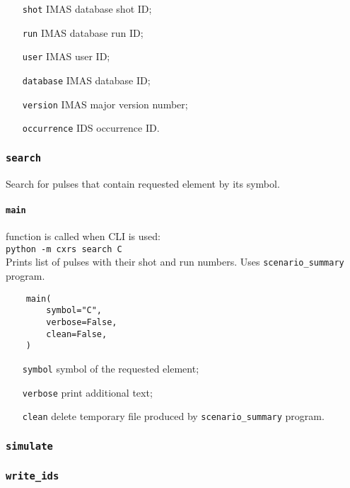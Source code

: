 \documentclass[../../main]{subfiles}
\begin{document}
\begin{itemize}[align=left]
    \item[\texttt{shot}] IMAS database shot ID;
    \item[\texttt{run}] IMAS database run ID;
    \item[\texttt{user}] IMAS user ID;
    \item[\texttt{database}] IMAS database ID;
    \item[\texttt{version}] IMAS major version number;
    \item[\texttt{occurrence}] IDS occurrence ID.
\end{itemize}

\subsubsection{\texttt{search}}

Search for pulses that contain requested element by its symbol.

\paragraph{\texttt{main}} function is called when CLI is used:\\
\texttt{python -m cxrs search C}\\
Prints list of pulses with their shot and run numbers. Uses \texttt{scenario_summary} program.

\begin{verbatim}
    main(
        symbol="C",
        verbose=False,
        clean=False,
    )
\end{verbatim}

\begin{itemize}[align=left]
    \item[\texttt{symbol}] symbol of the requested element;
    \item[\texttt{verbose}] print additional text;
    \item[\texttt{clean}] delete temporary file produced by \texttt{scenario_summary} program.
\end{itemize}

\subsubsection{\texttt{simulate}}
\subsubsection{\texttt{write\_ids}}
\end{document}
